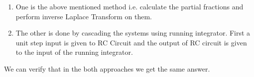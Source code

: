 \begin{enumerate}
\item One is the above mentioned method i.e. calculate the partial fractions and perform inverse Laplace Transform on them.

\item The other is done by cascading the systems using running integrator. First a unit step input is given to RC Circuit and the output of RC circuit is given to the input of the running integrator. 

\end{enumerate}
\noindent
We can verify that in the both approaches we get the same answer.





























                



                     
